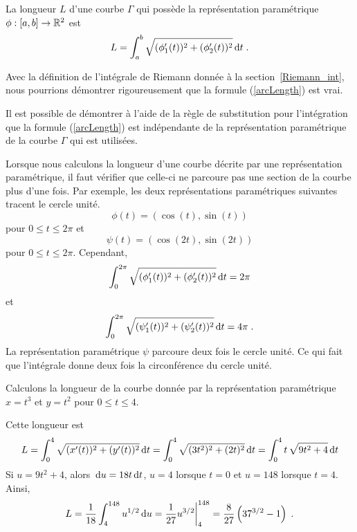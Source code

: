 {\begin{prop}
La longueur $L$ d'une courbe $\Gamma$ qui possède la représentation
paramétrique $\phi:[a,b]\rightarrow \mathbb{R}^2$ est
\begin{equation}\label{arcLength}
L = \int_a^b \sqrt{ (\phi_1'(t))^2 + (\phi_2'(t))^2} \,\mathrm{d}t \; .
\end{equation}
\end{prop}

\begin{rmk}[\theory]
Avec la définition de l'intégrale de Riemann
donnée à la section~\ref{Riemann_int}, nous pourrions démontrer
rigoureusement que la formule (\ref{arcLength}) est vrai.
\end{rmk}

Il est possible de démontrer à l'aide de la règle de substitution pour
l'intégration que la formule (\ref{arcLength}) est indépendante de la
représentation paramétrique de la courbe $\Gamma$ qui est utilisées.

\begin{rmk}
Lorsque nous calculons la longueur d'une courbe décrite par une
représentation paramétrique, il faut vérifier que celle-ci ne parcoure
pas une section de la courbe plus d'une fois.  Par exemple, les deux
représentations paramétriques suivantes tracent le cercle unité.
\[
  \phi(t) = \left( \cos(t) , \sin(t) \right)
\]
pour $0\leq t \leq 2\pi$ et
\[
  \psi(t) = \left( \cos(2t) , \sin(2t) \right)
\]
pour $0\leq t \leq 2\pi$.  Cependant,
\[
\int_0^{2\pi} \sqrt{ (\phi_1'(t))^2 + (\phi_2'(t))^2} \,\mathrm{d}t = 2\pi
\]
et
\[
\int_0^{2\pi} \sqrt{ (\psi_1'(t))^2 + (\psi_2'(t))^2} \,\mathrm{d}t = 4\pi
\; .
\]
La représentation paramétrique $\psi$ parcoure deux fois le cercle
unité.  Ce qui fait que l'intégrale donne deux fois la circonférence
du cercle unité.
\end{rmk}

\begin{egg}
Calculons la longueur de la courbe donnée par la représentation
paramétrique $x=t^3$ et $y=t^2$ pour $0\leq t \leq 4$.

Cette longueur est
\[
L = \int_0^4 \sqrt{ (x'(t))^2 + (y'(t))^2} \,\mathrm{d}t
= \int_0^4 \sqrt{ (3t^2)^2 + (2t)^2} \,\mathrm{d}t
= \int_0^4 t\, \sqrt{ 9t^2 + 4} \,\mathrm{d}t
\]
Si $u = 9t^2 + 4$, alors $\,\mathrm{d}u = 18 t \,\mathrm{d}t$, $u=4$ lorsque
$t=0$ et $u=148$ lorsque $t=4$.  Ainsi, 
\[
L = \frac{1}{18} \int_4^{148} u^{1/2} \,\mathrm{d}u
= \frac{1}{27} u^{3/2} \bigg|_4^{148} =
\frac{8}{27} \left( 37^{3/2} - 1 \right) \; .
\]
\end{egg}

}
